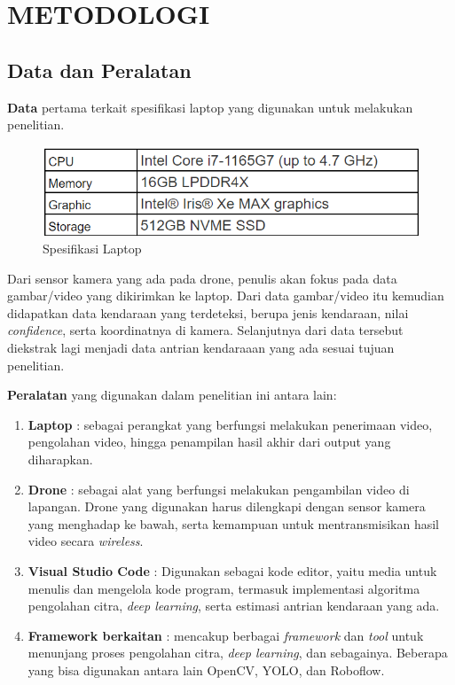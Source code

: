 \chapter{METODOLOGI}


\section{Data dan Peralatan}
\textbf{Data} pertama terkait spesifikasi laptop yang digunakan untuk melakukan penelitian.
\begin{figure} [H] \centering
  \includegraphics[scale=0.45]{gambar/spek_laptop.png}
  \caption{Spesifikasi Laptop}
  \label{fig:spek_laptop}
\end{figure}
Dari sensor kamera yang ada pada drone, penulis akan fokus pada data gambar/video yang dikirimkan ke laptop. Dari data gambar/video itu kemudian didapatkan data kendaraan yang terdeteksi, berupa jenis kendaraan, nilai \emph{confidence}, serta koordinatnya di kamera. Selanjutnya dari data tersebut diekstrak lagi menjadi data antrian kendaraaan yang ada sesuai tujuan penelitian.

\textbf{Peralatan} yang digunakan dalam penelitian ini antara lain:
\begin{enumerate}
  \item \textbf{Laptop} : sebagai perangkat yang berfungsi melakukan penerimaan video, pengolahan video, hingga penampilan hasil akhir dari output yang diharapkan.
  \item \textbf{Drone} : sebagai alat yang berfungsi melakukan pengambilan video di lapangan. Drone yang digunakan harus dilengkapi dengan sensor kamera yang menghadap ke bawah, serta kemampuan untuk mentransmisikan hasil video secara \emph{wireless}.
  \item \textbf{Visual Studio Code} : Digunakan sebagai kode editor, yaitu media untuk menulis dan mengelola kode program, termasuk implementasi algoritma pengolahan citra, \emph{deep learning}, serta estimasi antrian kendaraan yang ada.
  \item \textbf{Framework berkaitan} : mencakup berbagai \emph{framework} dan \emph{tool} untuk menunjang proses pengolahan citra, \emph{deep learning}, dan sebagainya. Beberapa yang bisa digunakan antara lain OpenCV, YOLO, dan Roboflow.
\end{enumerate}

